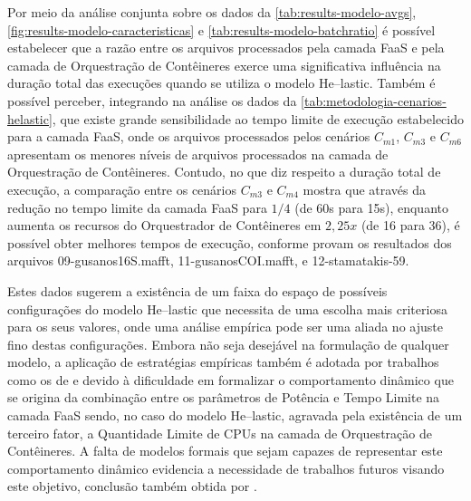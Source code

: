 \documentclass[english,brazilian]{UNISINOSmonografia} %
\begin{document}
Por meio da análise conjunta sobre os dados da \autoref{tab:results-modelo-avgs}, \autoref{fig:results-modelo-caracteristicas} e \autoref{tab:results-modelo-batchratio} é possível estabelecer que a razão entre os arquivos processados pela camada FaaS e pela camada de Orquestração de Contêineres exerce uma significativa influência na duração total das execuções quando se utiliza o modelo \textsf{He}--lastic.
%
Também é possível perceber, integrando na análise os dados da \autoref{tab:metodologia-cenarios-helastic}, que existe grande sensibilidade ao tempo limite de execução estabelecido para a camada FaaS, onde os arquivos processados pelos cenários $C_{m1}$, $C_{m3}$ e $C_{m6}$ apresentam os menores níveis de arquivos processados na camada de Orquestração de Contêineres.
%
Contudo, no que diz respeito a duração total de execução, a comparação entre os cenários $C_{m3}$ e $C_{m4}$ mostra que através da redução no tempo limite da camada FaaS para $1/4$ (de 60s para 15s), enquanto aumenta os recursos do Orquestrador de Contêineres em $2,25x$ (de 16 para 36), é possível obter melhores tempos de execução, conforme provam os resultados dos arquivos 09-gusanos16S.mafft, 11-gusanosCOI.mafft, e 12-stamatakis-59.



Estes dados sugerem a existência de um faixa do espaço de possíveis configurações do modelo \textsf{He}--lastic que necessita de uma escolha mais criteriosa para os seus valores, onde uma análise empírica pode ser uma aliada no ajuste fino destas configurações.
%
Embora não seja desejável na formulação de qualquer modelo, a aplicação de estratégias empíricas também é adotada por trabalhos como os de  e  devido à dificuldade em formalizar o comportamento dinâmico que se origina da combinação entre os parâmetros de Potência e Tempo Limite na camada FaaS sendo, no caso do modelo \textsf{He}--lastic, agravada pela existência de um terceiro fator, a Quantidade Limite de CPUs na camada de Orquestração de Contêineres.
%
A falta de modelos formais que sejam capazes de representar este comportamento dinâmico evidencia a necessidade de trabalhos futuros visando este objetivo, conclusão também obtida por .
\end{document}
